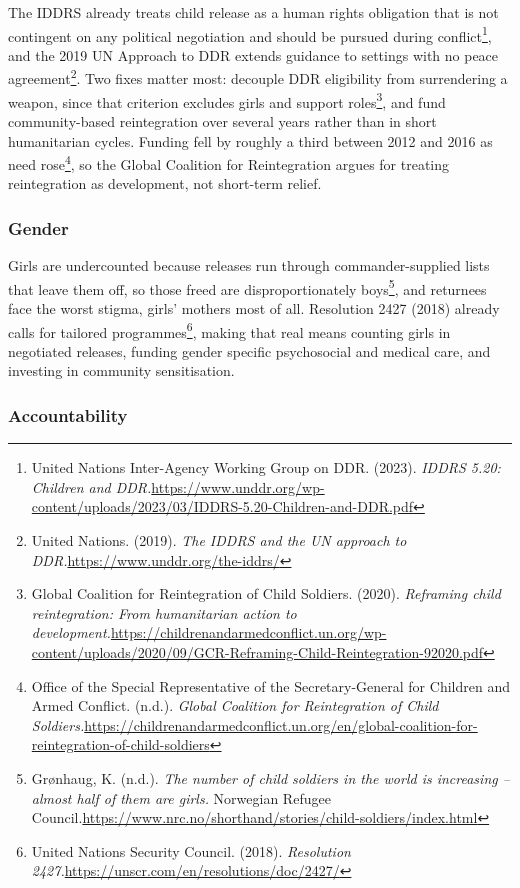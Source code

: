 The IDDRS already treats child release as a human rights obligation that is not contingent on any political negotiation and should be pursued during conflict\footnote{United Nations Inter-Agency Working Group on DDR. (2023). \emph{IDDRS 5.20: Children and DDR.}\url{https://www.unddr.org/wp-content/uploads/2023/03/IDDRS-5.20-Children-and-DDR.pdf}}, and the 2019 UN Approach to DDR extends guidance to settings with no peace agreement\footnote{United Nations. (2019). \emph{The IDDRS and the UN approach to DDR.}\url{https://www.unddr.org/the-iddrs/}}. Two fixes matter most: decouple DDR eligibility from surrendering a weapon, since that criterion excludes girls and support roles\footnote{Global Coalition for Reintegration of Child Soldiers. (2020). \emph{Reframing child reintegration: From humanitarian action to development.}\url{https://childrenandarmedconflict.un.org/wp-content/uploads/2020/09/GCR-Reframing-Child-Reintegration-92020.pdf}}, and fund community-based reintegration over several years rather than in short humanitarian cycles. Funding fell by roughly a third between 2012 and 2016 as need rose\footnote{Office of the Special Representative of the Secretary-General for Children and Armed Conflict. (n.d.). \emph{Global Coalition for Reintegration of Child Soldiers.}\url{https://childrenandarmedconflict.un.org/en/global-coalition-for-reintegration-of-child-soldiers}}, so the Global Coalition for Reintegration argues for treating reintegration as development, not short-term relief.

\subsubsection{Gender}

Girls are undercounted because releases run through commander-supplied lists that leave them off, so those freed are disproportionately boys\footnote{Grønhaug, K. (n.d.). \emph{The number of child soldiers in the world is increasing – almost half of them are girls.} Norwegian Refugee Council.\url{https://www.nrc.no/shorthand/stories/child-soldiers/index.html}}, and returnees face the worst stigma, girls' mothers most of all. Resolution 2427 (2018) already calls for tailored programmes\footnote{United Nations Security Council. (2018). \emph{Resolution 2427.}\url{https://unscr.com/en/resolutions/doc/2427/}}, making that real means counting girls in negotiated releases, funding gender specific psychosocial and medical care, and investing in community sensitisation.

\subsubsection{Accountability}

